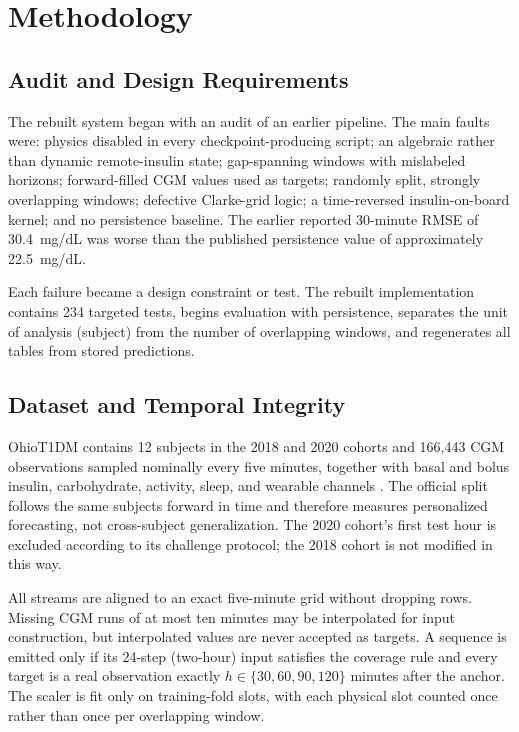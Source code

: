 \documentclass[journal]{IEEEtran}
\begin{document}
\section{Methodology}

\subsection{Audit and Design Requirements}


The rebuilt system began with an audit of an earlier pipeline. The main faults were: physics disabled in every checkpoint-producing script; an algebraic rather than dynamic remote-insulin state; gap-spanning windows with mislabeled horizons; forward-filled CGM values used as targets; randomly split, strongly overlapping windows; defective Clarke-grid logic; a time-reversed insulin-on-board kernel; and no persistence baseline. The earlier reported 30-minute RMSE of 30.4~mg/dL was worse than the published persistence value of approximately 22.5~mg/dL.

Each failure became a design constraint or test. The rebuilt implementation contains 234 targeted tests, begins evaluation with persistence, separates the unit of analysis (subject) from the number of overlapping windows, and regenerates all tables from stored predictions.

\subsection{Dataset and Temporal Integrity}

OhioT1DM contains 12 subjects in the 2018 and 2020 cohorts and 166,443 CGM observations sampled nominally every five minutes, together with basal and bolus insulin, carbohydrate, activity, sleep, and wearable channels \cite{ref30,ref31}. The official split follows the same subjects forward in time and therefore measures personalized forecasting, not cross-subject generalization. The 2020 cohort's first test hour is excluded according to its challenge protocol; the 2018 cohort is not modified in this way.

All streams are aligned to an exact five-minute grid without dropping rows. Missing CGM runs of at most ten minutes may be interpolated for input construction, but interpolated values are never accepted as targets. A sequence is emitted only if its 24-step (two-hour) input satisfies the coverage rule and every target is a real observation exactly $h \in \{30, 60, 90, 120\}$ minutes after the anchor. The scaler is fit only on training-fold slots, with each physical slot counted once rather than once per overlapping window.
\end{document}
